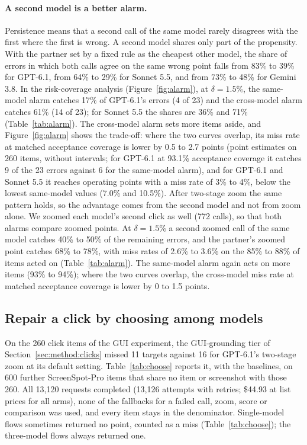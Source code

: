 \paragraph{A second model is a better alarm.} Persistence means that a second call of the same model rarely disagrees with the first where the first is wrong. A second model shares only part of the propensity. With the partner set by a fixed rule as the cheapest other model, the share of errors in which both calls agree on the same wrong point falls from 83\% to 39\% for GPT-6.1, from 64\% to 29\% for Sonnet 5.5, and from 73\% to 48\% for Gemini 3.8. In the risk-coverage analysis (Figure~\ref{fig:alarm}), at $\delta=1.5\%$, the same-model alarm catches 17\% of GPT-6.1's errors (4 of 23) and the cross-model alarm catches 61\% (14 of 23); for Sonnet 5.5 the shares are 36\% and 71\% (Table~\ref{tab:alarm}). The cross-model alarm sets more items aside, and Figure~\ref{fig:alarm} shows the trade-off: where the two curves overlap, its miss rate at matched acceptance coverage is lower by 0.5 to 2.7 points (point estimates on 260 items, without intervals; for GPT-6.1 at 93.1\% acceptance coverage it catches 9 of the 23 errors against 6 for the same-model alarm), and for GPT-6.1 and Sonnet 5.5 it reaches operating points with a miss rate of 3\% to 4\%, below the lowest same-model values (7.0\% and 10.5\%). After two-stage zoom the same pattern holds, so the advantage comes from the second model and not from zoom alone. We zoomed each model's second click as well (772 calls), so that both alarms compare zoomed points. At $\delta=1.5\%$ a second zoomed call of the same model catches 40\% to 50\% of the remaining errors, and the partner's zoomed point catches 68\% to 78\%, with miss rates of 2.6\% to 3.6\% on the 85\% to 88\% of items acted on (Table~\ref{tab:alarm}). The same-model alarm again acts on more items (93\% to 94\%); where the two curves overlap, the cross-model miss rate at matched acceptance coverage is lower by 0 to 1.5 points.




\subsection{Repair a click by choosing among models}\label{sec:res:choose}



On the 260 click items of the GUI experiment, the GUI-grounding tier of Section~\ref{sec:method:clicks} missed 11 targets against 16 for GPT-6.1's two-stage zoom at its default setting. Table~\ref{tab:choose} reports it, with the baselines, on 600 further ScreenSpot-Pro items that share no item or screenshot with those 260. All 13,120 requests completed (13,126 attempts with retries; \$44.93 at list prices for all arms), none of the fallbacks for a failed call, zoom, score or comparison was used, and every item stays in the denominator. Single-model flows sometimes returned no point, counted as a miss (Table~\ref{tab:choose}); the three-model flows always returned one.

